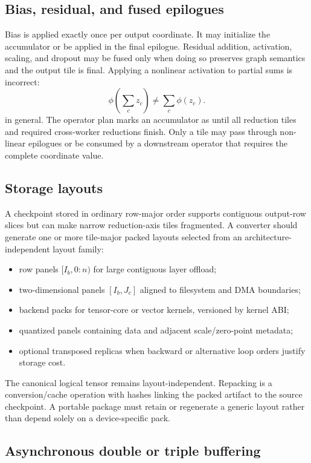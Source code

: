 \subsection{Bias, residual, and fused epilogues}

Bias is applied exactly once per output coordinate. It may initialize the accumulator or be applied in the final epilogue. Residual addition, activation, scaling, and dropout may be fused only when doing so preserves graph semantics and the output tile is final. Applying a nonlinear activation to partial sums is incorrect:
\[
  \phi\!\left(\sum_c z_c\right)\ne \sum_c\phi(z_c).
\]
in general.
The operator plan marks an accumulator as  until all reduction tiles and required cross-worker reductions finish. Only a  tile may pass through non-linear epilogues or be consumed by a downstream operator that requires the complete coordinate value.

\subsection{Storage layouts}

A checkpoint stored in ordinary row-major order supports contiguous output-row slices but can make narrow reduction-axis tiles fragmented. A converter should generate one or more tile-major packed layouts selected from an architecture-independent layout family:

\begin{itemize}
  \item row panels $[I_b,0:n)$ for large contiguous layer offload;
  \item two-dimensional panels $[I_b,J_c]$ aligned to filesystem and DMA boundaries;
  \item backend packs for tensor-core or vector kernels, versioned by kernel ABI;
  \item quantized panels containing data and adjacent scale/zero-point metadata;
  \item optional transposed replicas when backward or alternative loop orders justify storage cost.
\end{itemize}

The canonical logical tensor remains layout-independent. Repacking is a conversion/cache operation with hashes linking the packed artifact to the source checkpoint. A portable package must retain or regenerate a generic layout rather than depend solely on a device-specific pack.

\subsection{Asynchronous double or triple buffering}

